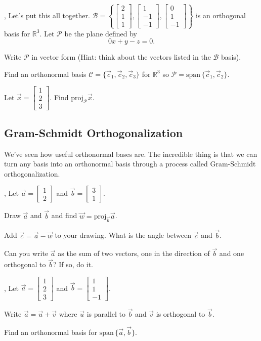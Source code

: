 \documentclass{article}
\newcommand{\R}{\mathbb{R}}
\newcommand{\proj}{\mathrm{proj}}
\renewcommand{\span}{\mathrm{span}\,}
\newcommand{\mat}[1]{\begin{bmatrix}#1\end{bmatrix}}
\begin{document}
	\sep
	Let's put this all together.  
	$\mathcal B=\left\{\mat{2\\1\\1},\mat{1\\-1\\-1},\mat{0\\1\\-1}\right\}$ is an
	orthogonal basis for $\R^3$.  Let $\mathcal P$ be the plane defined
	by
	\[
		0x+y-z=0.
	\]
	\begin{Enum}
		\item Write $\mathcal P$ in vector form (Hint: think about the vectors
			listed in the $\mathcal B$ basis).
		\item Find an orthonormal basis $\mathcal C=\{\vec c_1,\vec c_2,\vec c_3\}$
			for $\R^3$ so $\mathcal P=\span\{\vec c_1,\vec c_2\}$.
		\item Let $\vec x=\mat{1\\2\\3}$.  Find $\proj_{\mathcal P}\vec x$.
	\end{Enum}

\subsection*{Gram-Schmidt Orthogonalization}
	We've seen how useful orthonormal bases are.  The incredible thing is that we can 
	turn any basis into an orthonormal basis through a process called
	Gram-Schmidt orthogonalization.

	\sep
	Let $\vec a=\mat{1\\2}$ and $\vec b=\mat{3\\1}$.
	\begin{Enum}
		\item Draw $\vec a$ and $\vec b$ and find $\vec w=\proj_{\vec b}\vec a$.
		\item Add $\vec c=\vec a-\vec w$ to your drawing.  What is the angle between
			$\vec c$ and $\vec b$.
		\item Can you write $\vec a$ as the sum of two vectors, one in 
			the direction of $\vec b$ and one orthogonal to $\vec b$?
			If so, do it.
	\end{Enum}

	\sep
	Let $\vec a=\mat{1\\2\\3}$ and $\vec b=\mat{1\\1\\-1}$.
	\begin{Enum}
		\item Write $\vec a=\vec u+\vec v$ where $\vec u$ is parallel to
			$\vec b$ and $\vec v$ is orthogonal to $\vec b$.
		\item Find an orthonormal basis for $\span\{\vec a,\vec b\}$.
	\end{Enum}
\end{document}
